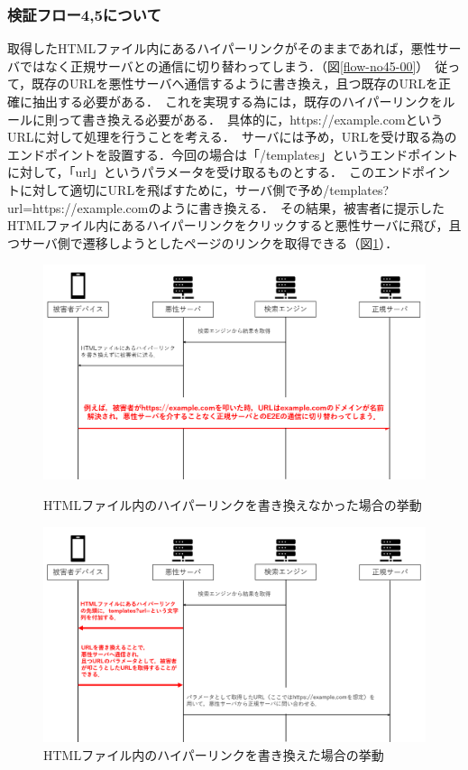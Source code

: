 \documentclass[dvipdfmx]{jsarticle}
\begin{document}
            \subsubsection{検証フロー4,5について}
                取得したHTMLファイル内にあるハイパーリンクがそのままであれば，悪性サーバではなく正規サーバとの通信に切り替わってしまう．（図\ref{flow-no45-00}）\
                従って，既存のURLを悪性サーバへ通信するように書き換え，且つ既存のURLを正確に抽出する必要がある．\
                これを実現する為には，既存のハイパーリンクをルールに則って書き換える必要がある．\
                具体的に，https://example.comというURLに対して処理を行うことを考える．\
                サーバには予め，URLを受け取る為のエンドポイントを設置する．今回の場合は「/templates」というエンドポイントに対して，「url」というパラメータを受け取るものとする．\
                このエンドポイントに対して適切にURLを飛ばすために，サーバ側で予め/templates?url=https://example.comのように書き換える．\
                その結果，被害者に提示したHTMLファイル内にあるハイパーリンクをクリックすると悪性サーバに飛び，且つサーバ側で遷移しようとしたページのリンクを取得できる（図\ref{flow-no45-01}）．
                \begin{figure}
                    \centering
                    \includegraphics[width=15cm]{img/vc-vf-4-5-00.png}
                    \caption{HTMLファイル内のハイパーリンクを書き換えなかった場合の挙動}
                    \label{flow-no45-00}
                    \includegraphics[width=15cm]{img/vc-vf-4-5-01.png}
                    \caption{HTMLファイル内のハイパーリンクを書き換えた場合の挙動}
                    \label{flow-no45-01}
                \end{figure}
                \clearpage
\end{document}
